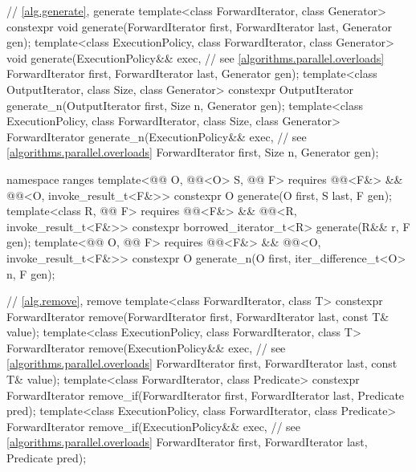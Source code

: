 \begin{codeblock}
{  // \ref{alg.generate}, generate
  template<class ForwardIterator, class Generator>
    constexpr void generate(ForwardIterator first, ForwardIterator last,
                            Generator gen);
  template<class ExecutionPolicy, class ForwardIterator, class Generator>
    void generate(ExecutionPolicy&& exec,                       // see \ref{algorithms.parallel.overloads}
                  ForwardIterator first, ForwardIterator last,
                  Generator gen);
  template<class OutputIterator, class Size, class Generator>
    constexpr OutputIterator generate_n(OutputIterator first, Size n, Generator gen);
  template<class ExecutionPolicy, class ForwardIterator, class Size, class Generator>
    ForwardIterator generate_n(ExecutionPolicy&& exec,          // see \ref{algorithms.parallel.overloads}
                               ForwardIterator first, Size n, Generator gen);

  namespace ranges {
    template<@@ O, @@<O> S, @@ F>
      requires @@<F&> && @@<O, invoke_result_t<F&>>
      constexpr O generate(O first, S last, F gen);
    template<class R, @@ F>
      requires @@<F&> && @@<R, invoke_result_t<F&>>
      constexpr borrowed_iterator_t<R> generate(R&& r, F gen);
    template<@@ O, @@ F>
      requires @@<F&> && @@<O, invoke_result_t<F&>>
      constexpr O generate_n(O first, iter_difference_t<O> n, F gen);
  }

  // \ref{alg.remove}, remove
  template<class ForwardIterator, class T>
    constexpr ForwardIterator remove(ForwardIterator first, ForwardIterator last,
                                     const T& value);
  template<class ExecutionPolicy, class ForwardIterator, class T>
    ForwardIterator remove(ExecutionPolicy&& exec,              // see \ref{algorithms.parallel.overloads}
                           ForwardIterator first, ForwardIterator last,
                           const T& value);
  template<class ForwardIterator, class Predicate>
    constexpr ForwardIterator remove_if(ForwardIterator first, ForwardIterator last,
                                        Predicate pred);
  template<class ExecutionPolicy, class ForwardIterator, class Predicate>
    ForwardIterator remove_if(ExecutionPolicy&& exec,           // see \ref{algorithms.parallel.overloads}
                              ForwardIterator first, ForwardIterator last,
                              Predicate pred);

}
\end{codeblock}
